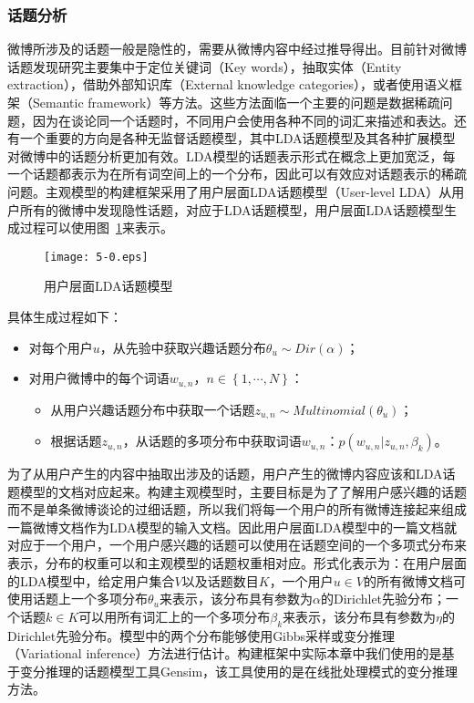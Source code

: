 \subsubsection{话题分析}
\label{topic}
微博所涉及的话题一般是隐性的，需要从微博内容中经过推导得出。目前针对微博话题发现研究主要集中于定位关键词（Key words），抽取实体（Entity extraction），借助外部知识库（External knowledge categories），或者使用语义框架（Semantic framework）等方法。这些方法面临一个主要的问题是数据稀疏问题，因为在谈论同一个话题时，不同用户会使用各种不同的词汇来描述和表达。还有一个重要的方向是各种无监督话题模型，其中LDA话题模型及其各种扩展模型对微博中的话题分析更加有效。LDA模型的话题表示形式在概念上更加宽泛，每一个话题都表示为在所有词空间上的一个分布，因此可以有效应对话题表示的稀疏问题。主观模型的构建框架采用了用户层面LDA话题模型（User-level LDA）从用户所有的微博中发现隐性话题，对应于LDA话题模型，用户层面LDA话题模型生成过程可以使用图~\ref{fig5-1}来表示。

\begin{figure}[htb]
\centering
\texttt{[image: 5-0.eps]}
\caption{用户层面LDA话题模型}
\label{fig5-1}
\end{figure}

具体生成过程如下：
\begin{itemize}
\item 对每个用户$ u $，从先验中获取兴趣话题分布$ \theta_{u} \sim Dir \left(  \alpha \right) $；
\item 对用户微博中的每个词语$ w_{u,n} $，$ n \in \left\lbrace 1, \cdots, N \right\rbrace $：
\begin{itemize}
\item 从用户兴趣话题分布中获取一个话题$ z_{u,n} \sim Multinomial \left( \theta_{u}  \right) $；
\item 根据话题$ z_{u,n} $，从话题的多项分布中获取词语$ w_{u,n} $：$ p \left( w_{u,n} \vert z_{u,n}, \beta_{k}  \right) $。
\end{itemize}
\end{itemize}

为了从用户产生的内容中抽取出涉及的话题，用户产生的微博内容应该和LDA话题模型的文档对应起来。构建主观模型时，主要目标是为了了解用户感兴趣的话题而不是单条微博谈论的过细话题，所以我们将每一个用户的所有微博连接起来组成一篇微博文档作为LDA模型的输入文档。因此用户层面LDA模型中的一篇文档就对应于一个用户，一个用户感兴趣的话题可以使用在话题空间的一个多项式分布来表示，分布的权重可以和主观模型的话题权重相对应。形式化表示为：在用户层面的LDA模型中，给定用户集合$ V $以及话题数目$ K $，一个用户$ u \in V $的所有微博文档可使用话题上一个多项分布$ \theta_{u} $来表示，该分布具有参数为$ \alpha $的Dirichlet先验分布；一个话题$ k \in K $可以用所有词汇上的一个多项分布$ \beta_{k} $来表示，该分布具有参数为$ \eta $的Dirichlet先验分布。模型中的两个分布能够使用Gibbs采样或变分推理（Variational inference）方法进行估计。构建框架中实际本章中我们使用的是基于变分推理的话题模型工具Gensim，该工具使用的是在线批处理模式的变分推理方法。

